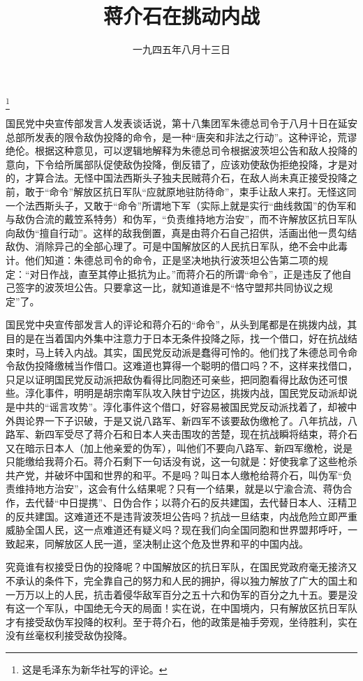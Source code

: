 
\title{蒋介石在挑动内战}
\date{一九四五年八月十三日}
\thanks{这是毛泽东为新华社写的评论。}
\maketitle


国民党中央宣传部发言人发表谈话说，第十八集团军朱德总司令于八月十日在延安总部所发表的限令敌伪投降的命令，是一种“唐突和非法之行动”。这种评论，荒谬绝伦。根据这种意见，可以逻辑地解释为朱德总司令根据波茨坦公告和敌人投降的意向，下令给所属部队促使敌伪投降，倒反错了，应该劝使敌伪拒绝投降，才是对的，才算合法。无怪中国法西斯头子独夫民贼蒋介石，在敌人尚未真正接受投降之前，敢于“命令”解放区抗日军队“应就原地驻防待命”，束手让敌人来打。无怪这同一个法西斯头子，又敢于“命令”所谓地下军（实际上就是实行“曲线救国”的伪军和与敌伪合流的戴笠系特务）和伪军，“负责维持地方治安”，而不许解放区抗日军队向敌伪“擅自行动”。这样的敌我倒置，真是由蒋介石自己招供，活画出他一贯勾结敌伪、消除异己的全部心理了。可是中国解放区的人民抗日军队，绝不会中此毒计。他们知道：朱德总司令的命令，正是坚决地执行波茨坦公告第二项的规定：“对日作战，直至其停止抵抗为止。”而蒋介石的所谓“命令”，正是违反了他自己签字的波茨坦公告。只要拿这一比，就知道谁是不“恪守盟邦共同协议之规定”了。

国民党中央宣传部发言人的评论和蒋介石的“命令”，从头到尾都是在挑拨内战，其目的是在当着国内外集中注意力于日本无条件投降之际，找一个借口，好在抗战结束时，马上转入内战。其实，国民党反动派是蠢得可怜的。他们找了朱德总司令命令敌伪投降缴械当作借口。这难道也算得一个聪明的借口吗？不，这样来找借口，只足以证明国民党反动派把敌伪看得比同胞还可亲些，把同胞看得比敌伪还可恨些。淳化事件，明明是胡宗南军队攻入陕甘宁边区，挑拨内战，国民党反动派却说是中共的“谣言攻势”。淳化事件这个借口，好容易被国民党反动派找着了，却被中外舆论界一下子识破，于是又说八路军、新四军不该要敌伪缴枪了。八年抗战，八路军、新四军受尽了蒋介石和日本人夹击围攻的苦楚，现在抗战瞬将结束，蒋介石又在暗示日本人（加上他亲爱的伪军），叫他们不要向八路军、新四军缴枪，说是只能缴给我蒋介石。蒋介石剩下一句话没有说，这一句就是：好使我拿了这些枪杀共产党，并破坏中国和世界的和平。不是吗？叫日本人缴枪给蒋介石，叫伪军“负责维持地方治安”，这会有什么结果呢？只有一个结果，就是以宁渝合流、蒋伪合作，去代替“中日提携”、日伪合作；以蒋介石的反共建国，去代替日本人、汪精卫的反共建国。这难道还不是违背波茨坦公告吗？抗战一旦结束，内战危险立即严重威胁全国人民，这一点难道还有疑义吗？现在我们向全国同胞和世界盟邦呼吁，一致起来，同解放区人民一道，坚决制止这个危及世界和平的中国内战。

究竟谁有权接受日伪的投降呢？中国解放区的抗日军队，在国民党政府毫无接济又不承认的条件下，完全靠自己的努力和人民的拥护，得以独力解放了广大的国土和一万万以上的人民，抗击着侵华敌军百分之五十六和伪军的百分之九十五。要是没有这一个军队，中国绝无今天的局面！实在说，在中国境内，只有解放区抗日军队才有接受敌伪军投降的权利。至于蒋介石，他的政策是袖手旁观，坐待胜利，实在没有丝毫权利接受敌伪投降。

